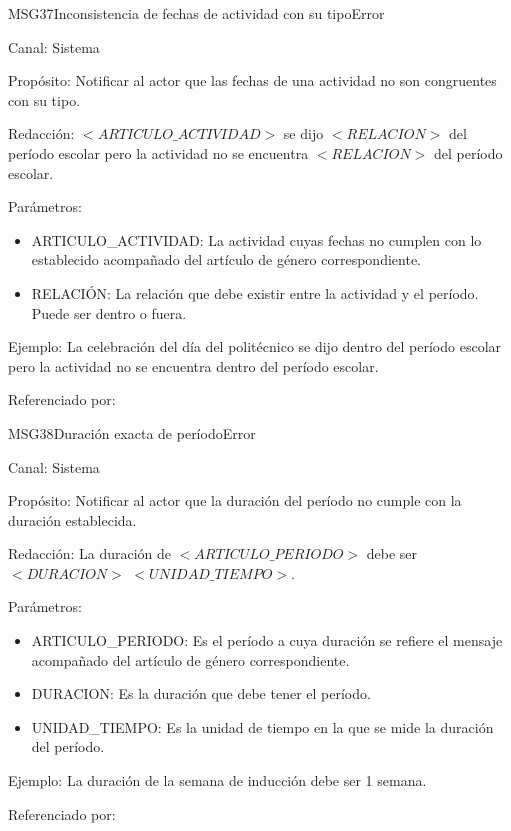 \begin{mensaje}{MSG37}{Inconsistencia de fechas de actividad con su tipo}{Error}
	\item[Canal:] Sistema
	\item[Propósito:] Notificar al actor que las fechas de una actividad no son congruentes con su tipo.
	\item[Redacción:] $<ARTICULO\_ACTIVIDAD>$ se dijo $<RELACION>$ del período escolar pero la actividad no se encuentra $<RELACION>$ del período escolar.
	\item[Parámetros:] 
	\begin{itemize}
		\item ARTICULO\_ACTIVIDAD: La actividad cuyas fechas no cumplen con lo establecido acompañado del artículo de género correspondiente.
		\item RELACIÓN: La relación que debe existir entre la actividad y el período. Puede ser dentro o fuera.
	\end{itemize}
	\item[Ejemplo:] La celebración del día del politécnico se dijo dentro del período escolar  pero la actividad no se encuentra dentro del período escolar.
	\item[Referenciado por:] 
\end{mensaje}

\begin{mensaje}{MSG38}{Duración exacta de período}{Error}
	\item[Canal:] Sistema
	\item[Propósito:] Notificar al actor que la duración del período no cumple con la duración establecida.
	\item[Redacción:] La duración de $<ARTICULO\_PERIODO>$  debe ser $<DURACION>$ $<UNIDAD\_TIEMPO>$.
	\item[Parámetros:] 
	\begin{itemize}
		\item ARTICULO\_PERIODO: Es el período a cuya duración se refiere el mensaje acompañado del artículo de género correspondiente.
		\item DURACION: Es la duración que debe tener el período.
		\item UNIDAD\_TIEMPO: Es la unidad de tiempo en la que se mide la duración del período.
	\end{itemize}
	\item[Ejemplo:] La duración de la semana de inducción debe ser 1 semana.
	\item[Referenciado por:] 
\end{mensaje}


